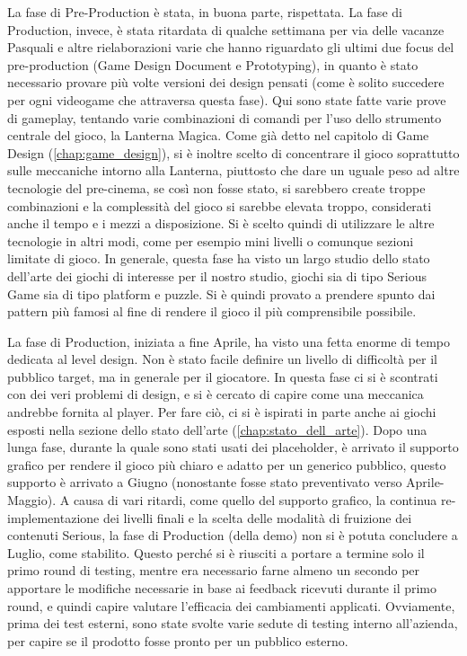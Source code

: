 La fase di Pre-Production è stata, in buona parte, rispettata. La fase di Production, invece, è stata ritardata di qualche settimana per via delle vacanze Pasquali e altre rielaborazioni varie che hanno riguardato gli ultimi due focus del pre-production (Game Design Document e Prototyping), in quanto è stato necessario provare più volte versioni dei design pensati (come è solito succedere per ogni videogame che attraversa questa fase). Qui sono state fatte varie prove di gameplay, tentando varie combinazioni di comandi per l'uso dello strumento centrale del gioco, la Lanterna Magica. Come già detto nel capitolo di Game Design (\ref{chap:game_design}), si è inoltre scelto di concentrare il gioco soprattutto sulle meccaniche intorno alla Lanterna, piuttosto che dare un uguale peso ad altre tecnologie del pre-cinema, se così non fosse stato, si sarebbero create troppe combinazioni e la complessità del gioco si sarebbe elevata troppo, considerati anche il tempo e i mezzi a disposizione. Si è scelto quindi di utilizzare le altre tecnologie in altri modi, come per esempio mini livelli o comunque sezioni limitate di gioco. In generale, questa fase ha visto un largo studio dello stato dell'arte dei giochi di interesse per il nostro studio, giochi sia di tipo Serious Game sia di tipo platform e puzzle. Si è quindi provato a prendere spunto dai pattern più famosi al fine di rendere il gioco il più comprensibile possibile.

La fase di Production, iniziata a fine Aprile, ha visto una fetta enorme di tempo dedicata al level design. Non è stato facile definire un livello di difficoltà per il pubblico target, ma in generale per il giocatore. In questa fase ci si è scontrati con dei veri problemi di design, e si è cercato di capire come una meccanica andrebbe fornita al player. Per fare ciò, ci si è ispirati in parte anche ai giochi esposti nella sezione dello stato dell'arte (\ref{chap:stato_dell_arte}). Dopo una lunga fase, durante la quale sono stati usati dei placeholder, è arrivato il supporto grafico per rendere il gioco più chiaro e adatto per un generico pubblico, questo supporto è arrivato a Giugno (nonostante fosse stato preventivato verso Aprile-Maggio). A causa di vari ritardi, come quello del supporto grafico, la continua re-implementazione dei livelli finali e la scelta delle modalità di fruizione dei contenuti Serious, la fase di Production (della demo) non si è potuta concludere a Luglio, come stabilito. Questo perché si è riusciti a portare a termine solo il primo round di testing, mentre era necessario farne almeno un secondo per apportare le modifiche necessarie in base ai feedback ricevuti durante il primo round, e quindi capire valutare l'efficacia dei cambiamenti applicati. Ovviamente, prima dei test esterni, sono state svolte varie sedute di testing interno all'azienda, per capire se il prodotto fosse pronto per un pubblico esterno.


